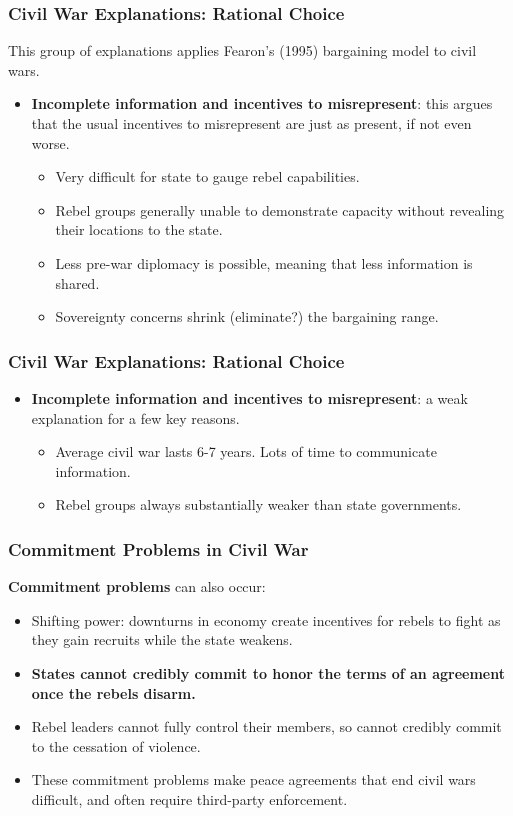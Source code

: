 \documentclass{beamer}
\begin{document}
\begin{frame} 
	\frametitle{\LARGE{Civil War Explanations: Rational Choice}}
	This group of explanations applies Fearon's (1995) bargaining model to civil wars. \pause
	\begin{itemize}
		\item \textbf{Incomplete information and incentives to misrepresent}: this argues that the usual incentives to misrepresent are just as present, if not even worse.
		\begin{itemize}
			\item Very difficult for state to gauge rebel capabilities. \pause
			\item Rebel groups generally unable to demonstrate capacity without revealing their locations to the state. \pause
			\item Less pre-war diplomacy is possible, meaning that less information is shared. \pause
			\item Sovereignty concerns shrink (eliminate?) the bargaining range.
		\end{itemize}
	\end{itemize}
\end{frame}

\begin{frame} 
	\frametitle{\LARGE{Civil War Explanations: Rational Choice}}
	\begin{itemize}
	\item \textbf{Incomplete information and incentives to misrepresent}: a weak explanation for a few key reasons.
	\begin{itemize}
		\item Average civil war lasts 6-7 years. Lots of time to communicate information. \pause
		\item Rebel groups always substantially weaker than state governments.
	\end{itemize}
	\end{itemize}
\end{frame}

\begin{frame} 
	\frametitle{\LARGE{Commitment Problems in Civil War}}
\textbf{Commitment problems} can also occur:
	\begin{itemize}
			\item Shifting power: downturns in economy create incentives for rebels to fight as they gain recruits while the state weakens. \pause
			\item \textbf{States cannot credibly commit to honor the terms of an agreement once the rebels disarm.} \pause 
			\item Rebel leaders cannot fully control their members, so cannot credibly commit to the cessation of violence. \pause
			\item These commitment problems make peace agreements that end civil wars difficult, and often require third-party enforcement.
	\end{itemize}
\end{frame}
\end{document}
